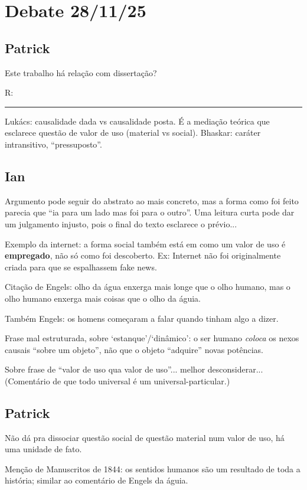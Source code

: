 \documentclass[12pt]{article}
\begin{document}
\section{Debate 28/11/25}
\subsection{Patrick}
Este trabalho há relação com dissertação?

R: 

\hrule

Lukács: causalidade dada vs causalidade posta. É a mediação teórica que esclarece questão de valor de uso (material vs social). Bhaskar: caráter intransitivo,  ``pressuposto''. 


\subsection{Ian}
Argumento pode seguir do abstrato ao mais concreto, mas a forma como foi feito parecia que ``ia para um lado mas foi para o outro''. Uma leitura curta pode dar um julgamento injusto, pois o final do texto esclarece o prévio...

Exemplo da internet: a forma social também está em como um valor de uso é \textbf{empregado}, não só como foi descoberto. Ex: Internet não foi originalmente criada para que se espalhassem fake news.

Citação de Engels: olho da água enxerga mais longe que o olho humano, mas o olho humano enxerga mais coisas que o olho da águia.

Também Engels: os homens começaram a falar quando tinham algo a dizer.

Frase mal estruturada, sobre `estanque'/`dinâmico': o ser humano \textit{coloca} os nexos causais ``sobre um objeto'', não que o objeto ``adquire'' novas potências.

Sobre frase de ``valor de uso qua valor de uso''... melhor desconsiderar... (Comentário de que todo universal é um universal-particular.) 


\subsection{Patrick}
Não dá pra dissociar questão social de questão material num valor de uso, há uma unidade de fato.

Menção de Manuscritos de 1844: os sentidos humanos são um resultado de toda a história; similar ao comentário de Engels da águia.
\end{document}
